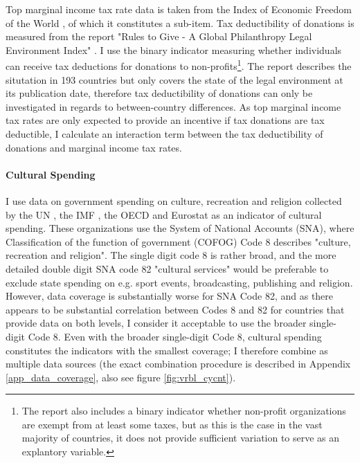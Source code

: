\documentclass[11pt]{article}
\begin{document}
Top marginal income tax rate data is taken from the Index of Economic Freedom of the World \parencite{Fraser_2022_economic_freedom}, of which it constitutes a sub-item.
Tax deductibility of donations is measured from the report "Rules to Give - A Global Philanthropy Legal Environment Index" \parencite{Quick_Kruse_Pickering_2014_philanthropy}.
I use the binary indicator measuring whether individuals can receive tax deductions for donations to non-profits\footnote{The report also includes a binary indicator whether non-profit organizations are exempt from at least some taxes, but as this is the case in the vast majority of countries, it does not provide sufficient variation to serve as an explantory variable.}.
The report describes the situtation in 193 countries but only covers the state of the legal environment at its publication date, therefore tax deductibility of donations can only be investigated in regards to between-country differences.
As top marginal income tax rates are only expected to provide an incentive if tax donations are tax deductible, I calculate an interaction term between the tax deductibility of donations and marginal income tax rates. 

\paragraph*{Cultural Spending}


I use data on government spending on culture, recreation and religion collected by the UN \parencite{UN_2022_consumption}, the IMF \parencite{IMF_2022_GFS}, the OECD \parencite{OECD_2022_SNA_TABLE11_ARCHIVE,OECD_2022_SNA_TABLE11} and Eurostat \parencite{Eurostat_2022_COFOG} as an indicator of cultural spending.
These organizations use the System of National Accounts (SNA), where Classification of the function of government (COFOG) Code 8 describes "culture, recreation and religion".
The single digit code 8 is rather broad, and the more detailed  double digit SNA code 82 "cultural services" would be preferable to exclude state spending on e.g. sport events, broadcasting, publishing and religion. 
However, data coverage is substantially worse for SNA Code 82, and as there appears to be substantial correlation between Codes 8 and 82 for countries that provide data on both levels, I consider it acceptable to use the broader single-digit Code 8.
Even with the broader single-digit Code 8, cultural spending constitutes the indicators with the smallest coverage; I therefore combine as multiple data sources (the exact combination procedure is described in Appendix \ref{app_data_coverage}, also see figure \ref{fig:vrbl_cycnt}).
\end{document}
